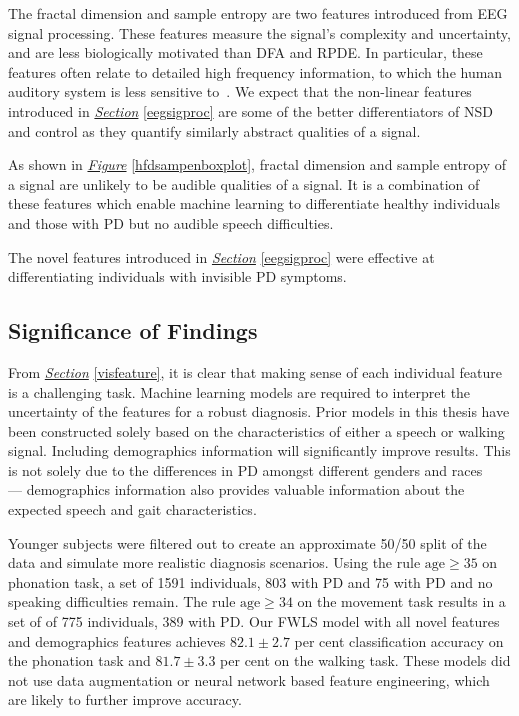 \documentclass[12pt, twoside]{book}
\begin{document}
The fractal dimension and sample entropy are two features introduced from EEG signal processing. These features measure the signal's complexity and uncertainty, and are less biologically motivated than DFA and RPDE. In particular, these features often relate to detailed high frequency information, to which the human auditory system is less sensitive to~\cite{auditoryrange}. We  expect that the non-linear features introduced in \textit{\hyperref[eegsigproc]{Section}} \ref{eegsigproc} are some of the better differentiators of NSD and control as they quantify similarly abstract qualities of a signal.


As shown in \textit{\hyperref[hfdsampenboxplot]{Figure}} \ref{hfdsampenboxplot}, fractal dimension and sample entropy of a signal are unlikely to be audible qualities of a signal. It is a combination of these features which enable machine learning to differentiate healthy individuals and those with PD but no audible speech difficulties.

\begin{highlight}
	The novel features introduced in \textit{\hyperref[eegsigproc]{Section}} \ref{eegsigproc} were effective at differentiating individuals with invisible PD symptoms.
\end{highlight}

\newpage
\subsection{Significance of Findings}

From \textit{\hyperref[visfeature]{Section}} \ref{visfeature}, it is clear that making sense of each individual feature is a challenging task. Machine learning models are required to interpret the uncertainty of the features for a robust diagnosis. Prior models in this thesis have been constructed solely based on the characteristics of either a speech or walking signal. Including demographics information will significantly improve results. This is not solely due to the differences in PD amongst different genders and races ~\cite{gender,gendersymptoms,ageracial} --- demographics information also provides valuable information about the expected speech and gait characteristics.

Younger subjects were filtered out to create an approximate 50/50 split of the data and simulate more realistic diagnosis scenarios. Using the rule $\text{age}\geq35$ on phonation task, a set of 1591 individuals, 803 with PD and 75 with PD and no speaking difficulties remain. The rule $\text{age}\geq34$ on the movement task results in a set of of 775 individuals, 389 with PD. Our FWLS model with all novel features and demographics features achieves $82.1\pm2.7$ per cent classification accuracy on the phonation task and $81.7\pm3.3$ per cent on the walking task. These models did not use data augmentation or neural network based feature engineering, which are likely to further improve accuracy.
\end{document}

